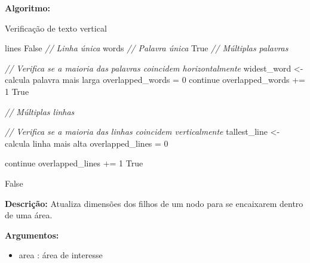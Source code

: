 \textbf{Algoritmo:}

\begin{breakablealgorithm}
	\caption{Verificação de texto vertical}
	\footnotesize
	\begin{algorithmic}[1]
			\State lines
				\Return False
			\EndIf
			\State \textit{// Linha única}
				\State words
			 \State \textit{// Palavra única}
						\Return True
					\EndIf
				\State \textit{// Múltiplas palavras} 
				
				\Else
					\State \textit{// Verifica se a maioria das palavras coincidem horizontalmente}
					\State widest\_word <- calcula palavra mais larga
					\State overlapped\_words = 0
							\State continue
						\EndIf
							\State overlapped\_words += 1
						\EndIf
					\EndFor
						\Return True
					\EndIf
					
				\EndIf
				
			\State \textit{// Múltiplas linhas} 
			
			\Else
				\State \textit{// Verifica se a maioria das linhas coincidem verticalmente}
				\State tallest\_line <- calcula linha mais alta
				\State overlapped\_lines = 0
				
						\State continue
					\EndIf
						\State overlapped\_lines += 1
					\EndIf
				\EndFor
					\Return True
				\EndIf
			
			\EndIf
			
		\EndIf
		
		\Return	False
		
	\end{algorithmic}
\end{breakablealgorithm}




\textbf{Descrição:} Atualiza dimensões dos filhos de um nodo para se encaixarem dentro de uma área.


\textbf{Argumentos:}
\begin{itemize}\setlength\itemsep{-0.3em}
	\vspace{-0.5em}
	\item area : área de interesse
\end{itemize}


